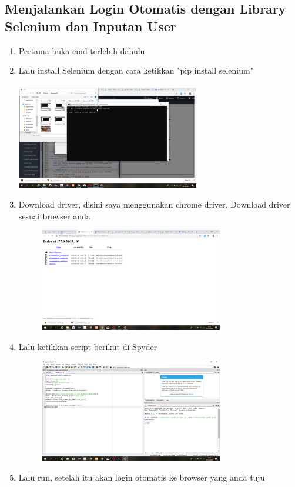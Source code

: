 \documentclass{article}
\begin{document}
\subsection{Menjalankan Login Otomatis dengan Library Selenium dan Inputan User}
\begin{enumerate}
    \item Pertama buka cmd terlebih dahulu
    \item Lalu install Selenium dengan cara ketikkan "pip install selenium"
        \paragraph{}
            \centerline{\includegraphics[width=8cm]{image/pipinstallsel.png}}
    \item Download driver, disini saya menggunakan chrome driver. Download driver sesuai browser anda
        \begin{figure}[h]
            \centerline{\includegraphics[width=8cm]{image/chromedriver.png}}
        \end{figure}
    \item Lalu ketikkan script berikut di Spyder
        \begin{figure}[h]
            \centerline{\includegraphics[width=8cm]{image/scriptsele.png}}
        \end{figure}
    \item Lalu run, setelah itu akan login otomatis ke browser yang anda tuju
\end{enumerate}
\end{document}
